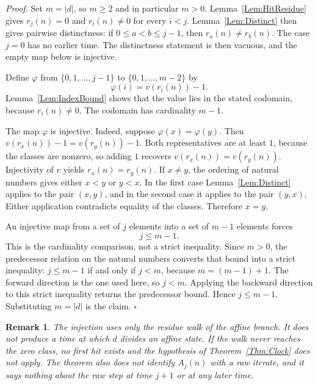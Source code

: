 \documentclass[11pt,letterpaper]{article}
\newtheorem{remark}[theorem]{Remark}
\newenvironment{proof}{\noindent\textit{Proof.}}{\hfill\(\square\)}
\begin{document}
\begin{proof}
Set \(m=|d|\), so \(m\ge 2\) and in particular \(m>0\). Lemma~\ref{Lem:HitResidue} gives \(r_{j}(n)=0\) and \(r_{i}(n)\neq 0\) for every \(i<j\). Lemma~\ref{Lem:Distinct} then gives pairwise distinctness: if \(0\le a<b\le j-1\), then \(r_{a}(n)\neq r_{b}(n)\). The case \(j=0\) has no earlier time. The distinctness statement is then vacuous, and the empty map below is injective.

Define \(\varphi\) from \(\{0,1,\ldots,j-1\}\) to \(\{0,1,\ldots,m-2\}\) by
\[
\varphi(i)=v(r_{i}(n))-1.
\]
Lemma~\ref{Lem:IndexBound} shows that the value lies in the stated codomain, because \(r_{i}(n)\neq 0\). The codomain has cardinality \(m-1\).

The map \(\varphi\) is injective. Indeed, suppose \(\varphi(x)=\varphi(y)\). Then \(v(r_{x}(n))-1=v(r_{y}(n))-1\). Both representatives are at least \(1\), because the classes are nonzero, so adding \(1\) recovers \(v(r_{x}(n))=v(r_{y}(n))\). Injectivity of \(v\) yields \(r_{x}(n)=r_{y}(n)\). If \(x\neq y\), the ordering of natural numbers gives either \(x<y\) or \(y<x\). In the first case Lemma~\ref{Lem:Distinct} applies to the pair \((x,y)\), and in the second case it applies to the pair \((y,x)\). Either application contradicts equality of the classes. Therefore \(x=y\).

An injective map from a set of \(j\) elements into a set of \(m-1\) elements forces
\[
j\le m-1.
\]
This is the cardinality comparison, not a strict inequality. Since \(m>0\), the predecessor relation on the natural numbers converts that bound into a strict inequality: \(j\le m-1\) if and only if \(j<m\), because \(m=(m-1)+1\). The forward direction is the one used here, so \(j<m\). Applying the backward direction to this strict inequality returns the predecessor bound. Hence \(j\le m-1\). Substituting \(m=|d|\) is the claim.
\end{proof}

\begin{remark}
The injection uses only the residue walk of the affine branch. It does not produce a time at which \(d\) divides an affine state. If the walk never reaches the zero class, no first hit exists and the hypothesis of Theorem~\ref{Thm:Clock} does not apply. The theorem also does not identify \(A_{j}(n)\) with a raw iterate, and it says nothing about the raw step at time \(j+1\) or at any later time.
\end{remark}
\end{document}
